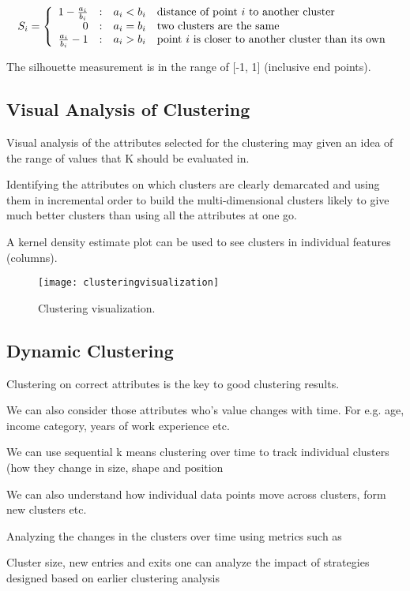 	\begin{equation}
		S_i = \left\{ \begin{array}{r@{\quad : \quad}ll}
									1-\frac{a_i}{b_i}    &   a_i < b_i  & \text{distance of point $i$ to another cluster}    \\
                                            0            &   a_i = b_i  & \text{two clusters are the same}    \\
                                    \frac{a_i}{b_i}-1    &   a_i > b_i  & \text{point $i$ is closer to another cluster than its own}    \\
                      \end{array}\right.
	\end{equation}

The silhouette measurement is in the range of [-1, 1] (inclusive end points).

	\subsection{Visual Analysis of Clustering}
	\begin{bulletedlist}
		\item Visual analysis of the attributes selected for the clustering may given an idea of the range of values that K should be evaluated in.
		\item Identifying the attributes on which clusters are clearly demarcated and using them in incremental order to build the multi-dimensional clusters likely to give much better clusters than using all the attributes at one go.
		\item A kernel density estimate plot can be used to see clusters in individual features (columns).
	\end{bulletedlist}

	\begin{figure}[h]
		\centering
		\texttt{[image: clusteringvisualization]}
		\caption{Clustering visualization.}
		\label{fig:clusteringvisualization}
	\end{figure}

	\subsection{Dynamic Clustering}
	\begin{bulletedlist}
		\item Clustering on correct attributes is the key to good clustering results.
		\item We can also consider those attributes who's value changes with time. For e.g. age, income category, years of work experience etc.
		\item We can use sequential k means clustering over time to track individual clusters (how they change in size, shape and position
		\item We can also understand how individual data points move across clusters, form new clusters etc.
		\item Analyzing the changes in the clusters over time using metrics such as
		\item Cluster size, new entries and exits one can analyze the impact of strategies designed based on earlier clustering analysis
	\end{bulletedlist}
